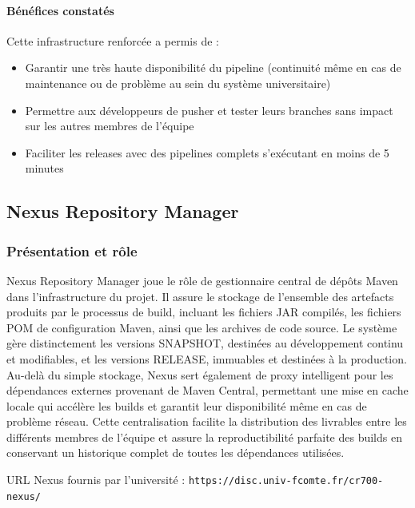 \paragraph{Bénéfices constatés}

Cette infrastructure renforcée a permis de :
\begin{itemize}
    \item Garantir une très haute disponibilité du pipeline (continuité même en cas de maintenance ou de problème au sein du système universitaire)
    \item Permettre aux développeurs de pusher et tester leurs branches sans impact sur les autres membres de l'équipe
    \item Faciliter les releases avec des pipelines complets s'exécutant en moins de 5 minutes
\end{itemize}

\subsection{Nexus Repository Manager}

\subsubsection{Présentation et rôle}

Nexus Repository Manager joue le rôle de gestionnaire central de dépôts Maven dans l'infrastructure du projet. Il assure le stockage de l'ensemble des artefacts produits par le processus de build, incluant les fichiers JAR compilés, les fichiers POM de configuration Maven, ainsi que les archives de code source. Le système gère distinctement les versions SNAPSHOT, destinées au développement continu et modifiables, et les versions RELEASE, immuables et destinées à la production. Au-delà du simple stockage, Nexus sert également de proxy intelligent pour les dépendances externes provenant de Maven Central, permettant une mise en cache locale qui accélère les builds et garantit leur disponibilité même en cas de problème réseau. Cette centralisation facilite la distribution des livrables entre les différents membres de l'équipe et assure la reproductibilité parfaite des builds en conservant un historique complet de toutes les dépendances utilisées.

URL Nexus fournis par l'université : \texttt{https://disc.univ-fcomte.fr/cr700-nexus/}

